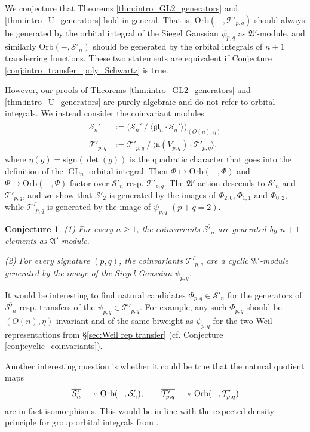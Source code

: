 \documentclass[reqno, 11pt]{amsart} %
\numberwithin{equation}{section}
\theoremstyle{plain}
\newtheorem{conjecture}[theorem]{Conjecture}
\theoremstyle{definition}
\theoremstyle{remark}
\newcommand{\ov}{\overline}
\newcommand{\mr}{\mathrm}
\newcommand{\mcS}{\mathcal{S}}
\newcommand{\mcT}{\mathcal{T}}
\newcommand{\mfA}{\mathfrak{A}}
\newcommand{\mfg}{\mathfrak{g}}
\newcommand{\mfl}{\mathfrak{l}}
\newcommand{\mfu}{\mathfrak{u}}
\newcommand{\mfgl}{\mfg\mfl}
\DeclareMathOperator{\GL}{GL}
\newcommand{\Orb}{\mathrm{Orb}}
\newcommand{\mn}{\medskip \noindent}
\begin{document}
We conjecture that Theorems \ref{thm:intro_GL2_generators} and \ref{thm:intro_U_generators} hold in general. That is, $\Orb(-,\mcT'_{p,q})$ should always be generated by the orbital integral of the Siegel Gaussian $ψ_{p,q}$ as $\mfA'$-module, and similarly $\Orb(-,\mcS'_n)$ should be generated by the orbital integrals of $n+1$ transferring functions. These two statements are equivalent if Conjecture \ref{conj:intro_transfer_poly_Schwartz} is true.

However, our proofs of Theorems \ref{thm:intro_GL2_generators} and \ref{thm:intro_U_generators} are purely algebraic and do not refer to orbital integrals. We instead consider the coinvariant modules
\begin{equation}\label{eq:intro_def_coinvariants}
\begin{aligned}
\ov{\mcS_n'} & := \big(\mcS_n'\ /\ \langle \mfgl_n\cdot \mcS_n'\rangle \big)_{(O(n),η)}\\[1mm]
\ov{\mcT'_{p,q}} & := \mcT'_{p,q}\ /\ \langle\mfu(V_{p,q})\cdot \mcT'_{p,q}\rangle,
\end{aligned}
\end{equation}
where $η(g) = \mr{sign}(\det(g))$ is the quadratic character that goes into the definition of the $\GL_n$-orbital integral. Then $Φ\mapsto \Orb(-,Φ)$ and $Ψ\mapsto \Orb(-,Ψ)$ factor over $\ov{\mcS'_n}$ resp. $\ov{\mcT'_{p,q}}$. The $\mfA'$-action descends to $\ov{\mcS'_n}$ and $\ov{\mcT'_{p,q}}$, and we show that $\ov{\mcS'_2}$ is generated by the images of $Φ_{2,0},Φ_{1,1}$ and $Φ_{0,2}$, while $\ov{\mcT'_{p,q}}$ is generated by the image of $ψ_{p,q}$ $(p+q = 2)$.
\begin{conjecture}\label{conj:intro_coinvariants}
(1) For every $n\geq 1$, the coinvariants $\ov{\mcS'_n}$ are generated by $n+1$ elements as $\mfA'$-module.

\mn (2) For every signature $(p,q)$, the coinvariants $\ov{\mcT'_{p,q}}$ are a cyclic $\mfA'$-module generated by the image of the Siegel Gaussian $ψ_{p,q}$.
\end{conjecture}
It would be interesting to find natural candidates $Φ_{p,q}\in \mcS'_n$ for the generators of $\ov{\mcS'_n}$ resp. transfers of the $ψ_{p,q}\in \mcT'_{p,q}$. For example, any such $Φ_{p,q}$ should be $(O(n),η)$-invariant and of the same biweight as $ψ_{p,q}$ for the two Weil representations from \S\ref{sec:Weil rep transfer} (cf. Conjecture \ref{conj:cyclic_coinvariants}).

Another interesting question is whether it could be true that the natural quotient maps
$$\ov{\mcS'_n}\ {\relbar\joinrel\twoheadrightarrow}\ \Orb(-,\mcS'_n),\qquad \ov{\mcT'_{p,q}}\ {\relbar\joinrel\twoheadrightarrow}\ \Orb(-,\mcT'_{p,q})$$
are in fact isomorphisms. This would be in line with the expected density principle for group orbital integrals from \cite[\S6.2.2]{CZ}.
\end{document}

